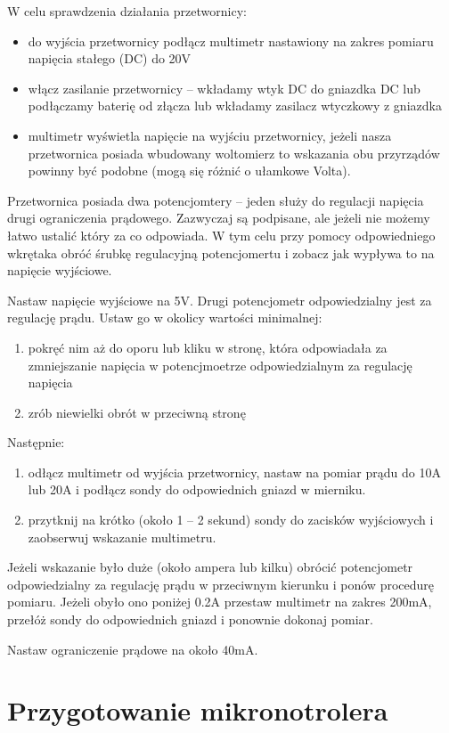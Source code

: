 \documentclass{pdfBooklets}
\begin{document}
W celu sprawdzenia działania przetwornicy:
\begin{itemize}
	\item do wyjścia przetwornicy podłącz multimetr nastawiony na zakres pomiaru napięcia stałego (DC) do 20V
	\item włącz zasilanie przetwornicy – wkładamy wtyk DC do gniazdka DC lub podłączamy baterię od złącza lub wkładamy zasilacz wtyczkowy z gniazdka
	\item multimetr wyświetla napięcie na wyjściu przetwornicy, jeżeli nasza przetwornica posiada wbudowany woltomierz to wskazania obu przyrządów powinny być podobne (mogą się różnić o ułamkowe Volta).
\end{itemize}

Przetwornica posiada dwa potencjomtery – jeden służy do regulacji napięcia drugi ograniczenia prądowego. Zazwyczaj są podpisane, ale jeżeli nie możemy łatwo ustalić który za co odpowiada.
W tym celu przy pomocy odpowiedniego wkrętaka obróć śrubkę regulacyjną potencjomertu i zobacz jak wypływa to na napięcie wyjściowe.

Nastaw napięcie wyjściowe na 5V. Drugi potencjometr odpowiedzialny jest za regulację prądu. Ustaw go w okolicy wartości minimalnej:
\begin{enumerate}
	\item pokręć nim aż do oporu lub kliku w stronę, która odpowiadała za zmniejszanie napięcia w potencjmoetrze odpowiedzialnym za regulację napięcia
	\item zrób niewielki obrót w przeciwną stronę
\end{enumerate}
Następnie:
\begin{enumerate}
	\item odłącz multimetr od wyjścia przetwornicy, nastaw na pomiar prądu do 10A lub 20A i podłącz sondy do odpowiednich gniazd w mierniku.
	\item przytknij na krótko (około 1 – 2 sekund) sondy do zacisków wyjściowych i zaobserwuj wskazanie multimetru.
\end{enumerate}
Jeżeli wskazanie było duże (około ampera lub kilku) obrócić potencjometr odpowiedzialny za regulację prądu w przeciwnym kierunku i ponów procedurę pomiaru.
Jeżeli obyło ono poniżej 0.2A przestaw multimetr na zakres 200mA, przełóż sondy do odpowiednich gniazd i ponownie dokonaj pomiar.

Nastaw ograniczenie prądowe na około 40mA.


\section{Przygotowanie mikronotrolera}
\end{document}

